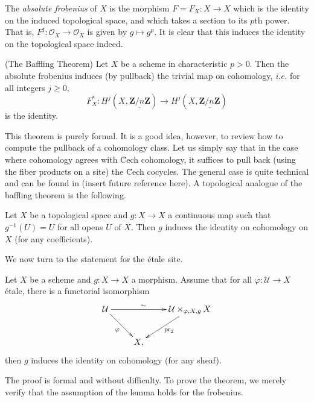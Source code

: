 \begin{definition}
\label{definition-absolute-frobenius}
The {\it absolute frobenius} of $X$ is the morphism $F = F_X : X \to X$ which
is the identity on the induced topological space, and which takes a section to
its $p$th power. That is, $F^\sharp : \mathcal{O}_X \to \mathcal{O}_X$ is given
by $g \mapsto g^p$. It is clear that this induces the identity on the
topological space indeed.
\end{definition}

\begin{theorem}
\label{theorem-baffling}
(The Baffling Theorem)
Let $X$ be a scheme in characteristic $p>0$. Then the absolute frobenius
induces (by pullback) the trivial map on cohomology, {\it i.e.} for all
integers $j\geq 0$,
$$
F_X^* : H^j (X, \underline{\mathbf{Z}/n\mathbf{Z}}) \longrightarrow H^j (X,
\underline{\mathbf{Z}/n\mathbf{Z}})
$$
is the identity.
\end{theorem}

\noindent
This theorem is purely formal. It is a good idea, however, to review how to
compute the pullback of a cohomology class. Let us simply say that in the case
where cohomology agrees with \u Cech cohomology, it suffices to pull back
(using the fiber products on a site) the \u Cech cocycles. The general case is
quite technical and can be found in (insert future reference here). A
topological analogue of the baffling theorem is the following.

\begin{exercise}
\label{exercise-baffling}
Let $X$ be a topological space and $g : X \to X$ a continuous map such that
$g^{-1}(U) = U$ for all opens $U$ of $X$. Then $g$ induces the identity on
cohomology on $X$ (for any coefficients).
\end{exercise}

\noindent
We now turn to the statement for the \'etale site.

\begin{lemma}
\label{lemma-baffling}
Let $X$ be a scheme and $g : X \to X$ a morphism. Assume that for all $\varphi:
\mathcal{U} \to X$ \'etale, there is a functorial isomorphism
$$
\xymatrix{
\mathcal{U} \ar_{\varphi}[rd] \ar^{\sim \quad}[rr] && {\mathcal{U}
\times_{\varphi, X,g} X} \ar^{\text{pr}_2}[ld]\\
& X,
}
$$
then $g$ induces the identity on cohomology (for any sheaf).
\end{lemma}

\noindent
The proof is formal and without difficulty. To prove the theorem, we merely
verify that the assumption of the lemma holds for the frobenius.

